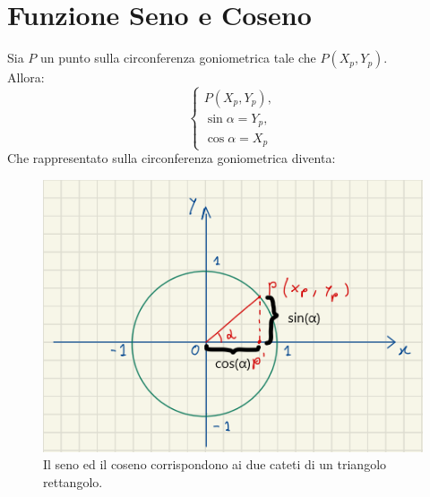 \documentclass[12pt]{article}
\begin{document}
\section{Funzione Seno e Coseno}
Sia $P$ un punto sulla circonferenza goniometrica tale che $P(X_p,Y_p)$.\\
Allora:
\begin{equation}
    \begin{cases}
        P(X_p,Y_p),\\
        \sin{\alpha} = Y_p,\\
        \cos{\alpha} = X_p
        \label{eq:sin_cos_definizione}
    \end{cases}
\end{equation}
Che rappresentato sulla circonferenza goniometrica diventa:
\begin{figure}[!htb]
    \centering
    \includegraphics[width=1\textwidth, height=.7\textheight,keepaspectratio]{lezione_6/sin_cos_definizione.png}
    \begin{center}
        \caption{\label{fig:sin_cos_definizione}Il seno ed il coseno corrispondono ai due cateti di un triangolo rettangolo.}
    \end{center}
\end{figure}
\pagebreak
\end{document}

